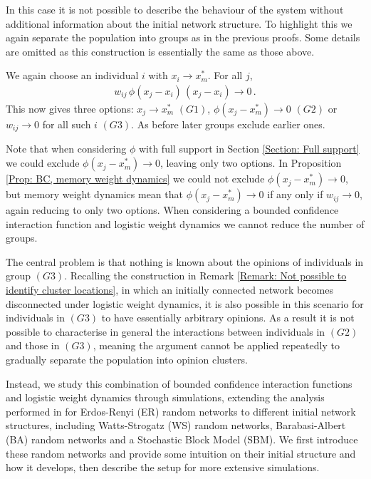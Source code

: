 \documentclass{article}
\begin{document}
In this case it is not possible to describe the behaviour of the system without additional information about the initial network structure. To highlight this we again separate the population into groups as in the previous proofs. Some details are omitted as this construction is essentially the same as those above. 

We again choose an individual $i$ with $x_i \rightarrow x_m^*$. For all $j$, 
\begin{align*}
    w_{ij}\,\phi(x_j - x_i)\,(x_j - x_i) \rightarrow 0 \,.
\end{align*}
This now gives three options: $x_j \rightarrow x_m^*$ $(G1)$, $\phi(x_j-x_m^*)\rightarrow 0$ $(G2)$ or $w_{ij}\rightarrow 0$ for all such $i$ $(G3)$. As before later groups exclude earlier ones. 

Note that when considering $\phi$ with full support in Section \ref{Section: Full support} we could exclude $\phi(x_j-x_m^*)\rightarrow 0$, leaving only two options. In Proposition \ref{Prop: BC, memory weight dynamics} we could not exclude $\phi(x_j-x_m^*)\rightarrow 0$, but memory weight dynamics mean that $\phi(x_j-x_m^*)\rightarrow 0$ if any only if $w_{ij}\rightarrow 0$, again reducing to only two options. When considering a bounded confidence interaction function and logistic weight dynamics we cannot reduce the number of groups. 

The central problem is that nothing is known about the opinions of individuals in group $(G3)$. Recalling the construction in Remark \ref{Remark: Not possible to identify cluster locations}, in which an initially connected network becomes disconnected under logistic weight dynamics, it is also possible in this scenario for individuals in $(G3)$ to have essentially arbitrary opinions. As a result it is not possible to characterise in general the interactions between individuals in $(G2)$ and those in $(G3)$, meaning the argument cannot be applied repeatedly to gradually separate the population into opinion clusters.

Instead, we study this combination of bounded confidence interaction functions and logistic weight dynamics through simulations, extending the analysis performed in \cite{nugent2023evolving} for Erdos-Renyi (ER) random networks to different initial network structures, including Watts-Strogatz (WS) random networks, Barabasi-Albert (BA) random networks and a Stochastic Block Model (SBM). We first introduce these random networks and provide some intuition on their initial structure and how it develops, then describe the setup for more extensive simulations.
\end{document}
